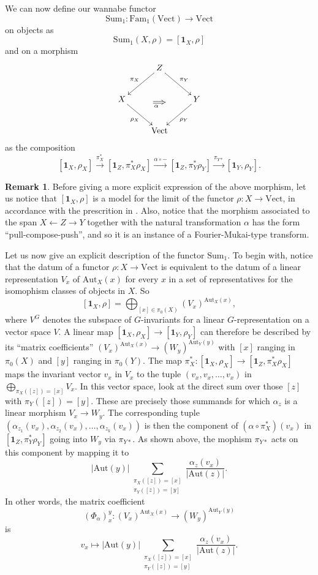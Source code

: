 \documentclass[12pt]{scrartcl}
\theoremstyle{definition}
\newtheorem{remark}[definition]{Remark}
\numberwithin{equation}{section}
\numberwithin{definition}{section}
\numberwithin{figure}{section}
\begin{document}
We can now define our wannabe functor
\[
\mathrm{Sum}_1\colon \mathrm{Fam}_1(\mathrm{Vect})\to \mathrm{Vect}
\]
on objects as 
\[
\mathrm{Sum}_1(X,\rho)=[\mathbf{1}_X,\rho]
\]
and on a morphism 
\[
\xymatrix{
&Z\ar[dl]_{\pi_X}\ar[dr]^{\pi_Y}&\\
X\ar[dr]_{\rho_X}&&Y\ar[dl]^{\rho_Y}\\
&\mathrm{Vect}
\ar@{=>}_{\alpha\phantom{m}}(13,-14);(18,-14)
}
\]
as the composition
\[
[\mathbf{1}_X,\rho_X]\xrightarrow{\pi_X^*} [\mathbf{1}_Z,\pi_X^*\rho_X]\xrightarrow{\alpha\circ-}  [\mathbf{1}_Z,\pi_Y^*\rho_Y] \xrightarrow{\pi_{Y*}} [\mathbf{1}_Y,\rho_Y].
\]

\begin{remark}
Before giving a more explicit expression of the above morphism, let us notice that $[\mathbf{1}_X,\rho]$ is a model for the limit of the functor $\rho\colon X\to \mathrm{Vect}$, in accordance with the prescrition in \cite{FHLT}. Also, notice that the morphism associated to the span $X\leftarrow Z\to Y$ together with the natural transformation $\alpha$ has the form ``pull-compose-push'', and so it is an instance of a Fourier-Mukai-type transform.
\end{remark}

Let us now give an explicit description of the functor $\mathrm{Sum}_1$. To begin with, notice that the datum of a functor $\rho\colon X\to \mathrm{Vect}$ is equivalent to the datum of a linear representation $V_x$ of $\mathrm{Aut}_X(x)$ for every $x$ in a set of representatives for the isomophism classes of objects in $X$. So 
\[
[\mathbf{1}_X,\rho]=\bigoplus_{[x]\in \pi_0(X)}(V_x)^{\mathrm{Aut}_X(x)},
\]
where $V^G$ denotes the subspace of $G$-invariants for a linear $G$-representation on a vector space $V$. A linear map $[\mathbf{1}_X,\rho_X]\to [\mathbf{1}_Y,\rho_Y]$ can therefore be described by its ``matrix coefficients'' $ (V_x)^{\mathrm{Aut}_X(x)}\to (W_y)^{\mathrm{Aut}_Y(y)}$ with $[x]$ ranging in $\pi_0(X)$ and $[y]$ ranging in $\pi_0(Y)$. The map
$\pi_X^*\colon [\mathbf{1}_X,\rho_X]\to [\mathbf{1}_Z,\pi_X^*\rho_X]$ maps the invariant vector $v_x$ in $V_x$ to the tuple $(v_x,v_x,\dots,v_x)$ in $\bigoplus_{\pi_X([z])=[x]}V_x$. In this vector space, look at the direct sum over those $[z]$ with $\pi_Y([z])=[y]$. These are precisely those summands for which $\alpha_z$ is a linear morphism $V_x\to W_y$. The corresponding tuple $(\alpha_{z_1}(v_x),\alpha_{z_2}(v_x),\dots, \alpha_{z_k}(v_x))$ is then the component of $(\alpha\circ\pi_X^*)(v_x)$ in $[\mathbf{1}_Z,\pi_Y^*\rho_Y]$ going into $W_y$ via $\pi_{Y*}$. As shown above, the mophism $\pi_{Y*}$ acts on this component by mapping it to
\[
|\mathrm{Aut}(y)|\sum_{\substack{\pi_X([z])=[x]\\ \pi_Y([z])=[y]}} \frac{\alpha_z(v_x)}{|\mathrm{Aut}(z)|} . 
\]
In other words, the matrix coefficient
\[
(\Phi_\alpha)_x^y\colon (V_x)^{\mathrm{Aut}_X(x)}\to (W_y)^{\mathrm{Aut}_Y(y)}
\]
is
\[
v_x\mapsto |\mathrm{Aut}(y)|\sum_{\substack{\pi_X([z])=[x]\\ \pi_Y([z])=[y]}} \frac{\alpha_z(v_x)}{|\mathrm{Aut}(z)|}.
\]
\end{document}
